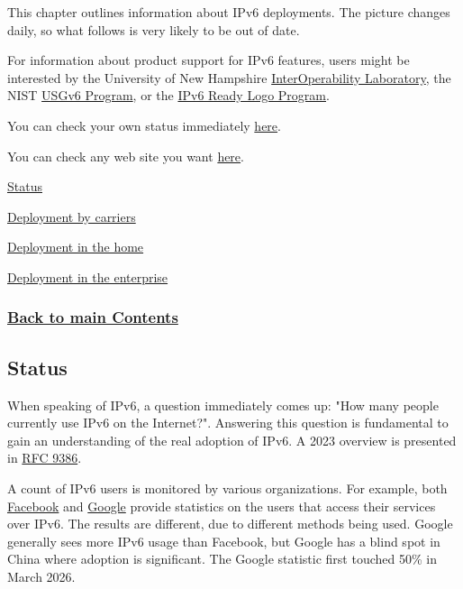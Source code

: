 \documentclass[
]{article}
\begin{document}
This chapter outlines information about IPv6 deployments. The picture
changes daily, so what follows is very likely to be out of date.

For information about product support for IPv6 features, users might be
interested by the University of New Hampshire
\href{https://www.iol.unh.edu/testing/ipv6}{InterOperability
Laboratory}, the NIST
\href{https://www.nist.gov/programs-projects/usgv6-program}{USGv6
Program}, or the \href{https://www.ipv6ready.org/}{IPv6 Ready Logo
Program}.

You can check your own status immediately
\href{https://test-ipv6.com/}{here}.

You can check any web site you want
\href{https://webres6.dev.sap/}{here}.

\hyperref[status]{Status}

\hyperref[deployment-by-carriers]{Deployment by carriers}

\hyperref[deployment-in-the-home]{Deployment in the home}

\hyperref[deployment-in-the-enterprise]{Deployment in the enterprise}

\subsubsection{\texorpdfstring{\hyperref[list-of-contents]{Back to main
Contents}}{Back to main Contents}}\label{back-to-main-contents-7}

\pagebreak

\subsection{Status}\label{status}

When speaking of IPv6, a question immediately comes up: "How many people
currently use IPv6 on the Internet?". Answering this question is
fundamental to gain an understanding of the real adoption of IPv6. A
2023 overview is presented in
\href{https://www.rfc-editor.org/info/rfc9386}{RFC 9386}.

A count of IPv6 users is monitored by various organizations. For
example, both
\href{https://www.facebook.com/ipv6/?tab=ipv6_total_adoption}{Facebook}
and \href{https://www.google.com/intl/en/ipv6/statistics.html}{Google}
provide statistics on the users that access their services over IPv6.
The results are different, due to different methods being used. Google
generally sees more IPv6 usage than Facebook, but Google has a blind
spot in China where adoption is significant. The Google statistic first
touched 50\% in March 2026.
\end{document}
